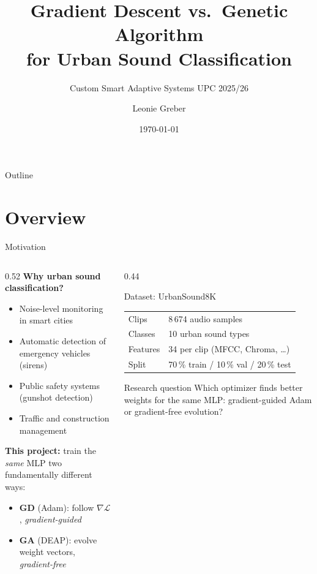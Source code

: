 \documentclass[aspectratio=169,10pt]{beamer}
\title{Gradient Descent vs.\ Genetic Algorithm\\for Urban Sound Classification}
\subtitle{Custom Smart Adaptive Systems \textperiodcentered{} UPC 2025/26}
\author{Leonie Greber}
\date{\today}
\begin{document}
\begin{frame}
  \titlepage
\end{frame}

\begin{frame}{Outline}
  \tableofcontents
\end{frame}

\section{Overview}

\begin{frame}{Motivation}
  \begin{columns}[T]
    \begin{column}{0.52\textwidth}
      \textbf{Why urban sound classification?}
      \begin{itemize}
        \item Noise-level monitoring in smart cities
        \item Automatic detection of emergency vehicles (sirens)
        \item Public safety systems (gunshot detection)
        \item Traffic and construction management
      \end{itemize}
      \vspace{0.4em}
      \textbf{This project:} train the \emph{same} MLP two fundamentally different ways:
      \begin{itemize}
        \item[\textcolor{gdblue}{$\bullet$}] \textcolor{gdblue}{\textbf{GD}} (Adam): follow $\nabla\mathcal{L}$, \emph{gradient-guided}
        \item[\textcolor{gaorange}{$\bullet$}] \textcolor{gaorange}{\textbf{GA}} (DEAP): evolve weight vectors, \emph{gradient-free}
      \end{itemize}
    \end{column}
    \begin{column}{0.44\textwidth}
      \begin{block}{Dataset: UrbanSound8K}
        \small
        \begin{tabular}{ll}
          Clips     & 8\,674 audio samples \\
          Classes   & 10 urban sound types \\
          Features  & 34 per clip (MFCC, Chroma, \ldots) \\
          Split     & 70\,\% train / 10\,\% val / 20\,\% test \\
        \end{tabular}
      \end{block}
      \vspace{0.4em}
      \begin{block}{Research question}
        \small Which optimizer finds better weights for the same MLP:
        gradient-guided Adam or gradient-free evolution?
      \end{block}
    \end{column}
  \end{columns}
\end{frame}
\end{document}
